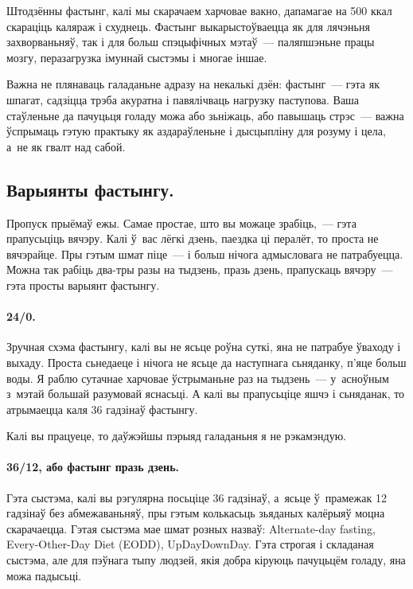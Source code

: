 Штодзённы фастынг, калі мы скарачаем харчовае вакно, дапамагае на 500 ккал скараціць каляраж і схуднець. Фастынг выкарыстоўваецца як для лячэньня захворваньняў, так і для больш спэцыфічных мэтаў~--- паляпшэньне працы мозгу, перазагрузка імуннай сыстэмы і многае іншае. 


Важна не плянаваць галаданьне адразу на некалькі дзён: фастынг~--- гэта як шпагат, садзіцца трэба акуратна і павялічваць нагрузку паступова. Ваша стаўленьне да пачуцьця голаду можа або зьніжаць, або павышаць стрэс~--- важна ўспрымаць гэтую практыку як аздараўленьне і дысцыпліну для розуму і цела, а~не як гвалт над сабой.

\subsection*{Варыянты фастынгу.}
Пропуск прыёмаў ежы. Самае простае, што вы можаце зрабіць,~--- гэта прапусьціць вячэру. Калі ў~вас лёгкі дзень, паездка ці пералёт, то проста не вячэрайце. Пры гэтым шмат піце~--- і больш нічога адмысловага не патрабуецца. Можна так рабіць два-тры разы на тыдзень, празь дзень, прапускаць вячэру~--- гэта просты варыянт фастынгу.

\paragraph{24/0.} Зручная схэма фастынгу, калі вы не ясьце роўна суткі, яна не патрабуе ўваходу і выхаду. Проста сьнедаеце і нічога не ясьце да наступнага сьняданку, п'яце больш воды. Я раблю сутачнае харчовае ўстрыманьне раз на тыдзень~--- у~асноўным з~мэтай большай разумовай яснасьці. А калі вы прапусьціце яшчэ і сьняданак, то атрымаецца каля 36 гадзінаў фастынгу. 

Калі вы працуеце, то даўжэйшы пэрыяд галаданьня я не рэкамэндую.

\paragraph{36/12, або фастынг празь дзень.} Гэта сыстэма, калі вы рэгулярна посьціце 36 гадзінаў, а~ясьце ў~прамежак 12 гадзінаў без абмежаваньняў, пры гэтым колькасьць зьяданых калёрыяў моцна скарачаецца. Гэтая сыстэма мае шмат розных назваў: Alternate-day fasting, Every-Other-Day Diet (EODD), UpDayDownDay. Гэта строгая і складаная сыстэма, але для пэўнага тыпу людзей, якія добра кіруюць пачуцьцём голаду, яна можа падысьці.

